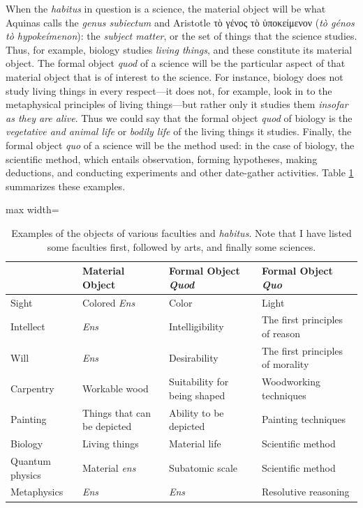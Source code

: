 \documentclass[
  12pt,
]{memoir}
\begin{document}
When the \emph{habitus} in question is a science, the material object
will be what Aquinas calls the \emph{genus subiectum} and Aristotle τὸ
γένος τὸ ὑποκείμενον (\emph{tò génos tò hypokeímenon}): the
\emph{subject matter}, or the set of things that the science studies.
Thus, for example, biology studies \emph{living things}, and these
constitute its material object. The formal object \emph{quod} of a
science will be the particular aspect of that material object that is of
interest to the science. For instance, biology does not study living
things in every respect---it does not, for example, look in to the
metaphysical principles of living things---but rather only it studies
them \emph{insofar as they are alive}. Thus we could say that the formal
object \emph{quod} of biology is the \emph{vegetative and animal life}
or \emph{bodily life} of the living things it studies. Finally, the
formal object \emph{quo} of a science will be the method used: in the
case of biology, the scientific method, which entails observation,
forming hypotheses, making deductions, and conducting experiments and
other date-gather activities. Table \ref{tab:examples-of-objects}
summarizes these examples.

\begin{table}[ht]
\begin{center}
\caption{Examples of the objects of various faculties and \emph{habitus}. Note that I have listed some faculties first, followed by arts, and finally some sciences.}
\label{tab:examples-of-objects}
{
\disablehyphenation
\begin{adjustbox}{max width=\textwidth}
\begin{tabular}{l|l|l|l}
\toprule
 & Material Object & Formal Object \emph{Quod} & Formal Object \emph{Quo} \\
\midrule
Sight & Colored \emph{Ens} & Color & Light \\
Intellect & \emph{Ens} & Intelligibility & The first principles of reason \\
Will & \emph{Ens} & Desirability & The first principles of morality \\
\midrule
Carpentry & Workable wood & Suitability for being shaped & Woodworking techniques \\
Painting & Things that can be depicted & Ability to be depicted & Painting techniques \\
\midrule
Biology & Living things & Material life & Scientific method \\
Quantum physics & Material \emph{ens} & Subatomic scale & Scientific method \\
Metaphysics & \emph{Ens} & \emph{Ens} & Resolutive reasoning \\
\bottomrule
\end{tabular}
\end{adjustbox}
}
\end{center}
\end{table}
\end{document}
